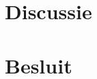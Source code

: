 \documentclass[a4paper,twoside,kulak]{kulakreport}
\begin{document}
	\chapter{Discussie}
	\chapter{Besluit}
	
	
	
	
	
	
	
	
	
	
	
	
	
	
	
	
	
\end{document}
